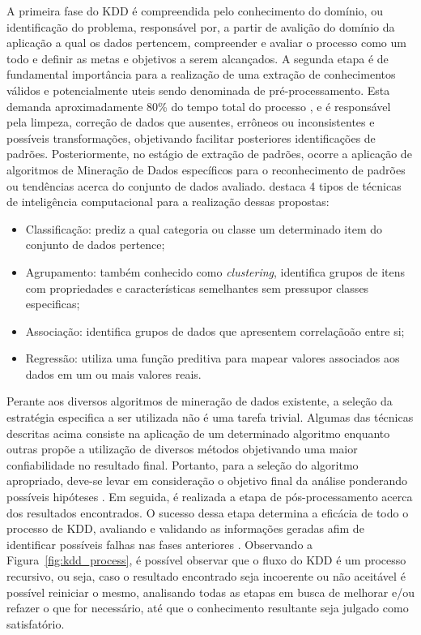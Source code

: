 A primeira fase do KDD é compreendida pelo conhecimento do domínio, ou identificação do problema, responsável por, a partir de avalição do domínio da aplicação a qual os dados pertencem, compreender e avaliar o processo como um todo e definir as metas e objetivos a serem alcançados. A segunda etapa é de fundamental importância para a realização de uma extração de conhecimentos válidos e potencialmente uteis sendo denominada de pré-processamento. Esta demanda aproximadamente 80\% do tempo total do processo \cite{cap02_ref13}, e é responsável pela limpeza, correção de dados que ausentes, errôneos ou inconsistentes e possíveis transformações, objetivando facilitar posteriores identificações de padrões.
Posteriormente, no estágio de extração de padrões, ocorre a aplicação de algoritmos de Mineração de Dados específicos para o reconhecimento de padrões ou tendências acerca do conjunto de dados avaliado. \cite{cap02_ref5} destaca 4 tipos de técnicas de inteligência computacional para a realização dessas propostas: 
\begin{itemize}
    \item Classificação: prediz a qual categoria ou classe um determinado item do conjunto de dados pertence;
    \item Agrupamento: também conhecido como \textit{clustering}, identifica grupos de itens com propriedades e características semelhantes sem pressupor classes especificas;
    \item Associação: identifica grupos de dados que apresentem correlaçãoão entre si;
    \item Regressão: utiliza uma função preditiva para mapear valores associados aos dados em um ou mais valores reais.
\end{itemize}

Perante aos diversos algoritmos de mineração de dados existente, a seleção da estratégia especifica a ser utilizada não é uma tarefa trivial. Algumas das técnicas descritas acima consiste na aplicação de um determinado algoritmo enquanto outras propõe a utilização de diversos métodos objetivando uma maior confiabilidade no resultado final. Portanto, para a seleção do algoritmo apropriado, deve-se levar em consideração o objetivo final da análise ponderando possíveis hipóteses \cite{cap02_ref14}.
Em seguida, é realizada a etapa de pós-processamento acerca dos resultados encontrados. O sucesso dessa etapa determina a eficácia de todo o processo de KDD, avaliando e validando as informações geradas afim de identificar possíveis falhas nas fases anteriores \cite{cap02_ref12}. Observando a Figura~\ref{fig:kdd_process}, é possível observar que o fluxo do KDD é um processo recursivo, ou seja, caso o resultado encontrado seja incoerente ou não aceitável é possível reiniciar o mesmo, analisando todas as etapas em busca de melhorar e/ou refazer o que for necessário, até que o conhecimento resultante seja julgado como satisfatório.



